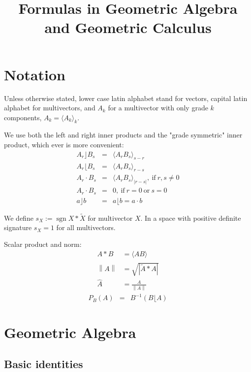 \documentclass[a4paper,12pt]{article}
\title{Formulas in Geometric Algebra and Geometric Calculus}
\author{}
\newcommand{\grade}[2]{\ensuremath{\langle#2\rangle_{#1}}}
\newcommand{\reverse}[1]{\tilde{#1}} %
\newcommand{\linner}{\ensuremath{\rfloor}}
\newcommand{\rinner}{\ensuremath{\lfloor}}
\providecommand{\abs}[1]{\lvert#1\rvert}
\providecommand{\norm}[1]{\left\lVert#1\right\rVert}
\providecommand{\normed}[1]{\hat{#1}}
\DeclareMathOperator{\sign}{sgn}
\providecommand{\signX}[1]{\ensuremath{s_{#1}}}
\begin{document}
\maketitle

\section{Notation}

Unless otherwise stated, lower case latin alphabet stand for vectors, capital latin alphabet for multivectors, and $A_k$ for a multivector with only grade $k$ components, $A_k = \grade{k}{A_k}$.

We use both the left and right inner products and the "grade symmetric" inner product, which ever is more convenient:
\begin{eqnarray}
A_r \linner B_s &=& \grade{s-r}{A_r B_s}\\
A_r \rinner B_s &=& \grade{r-s}{A_r B_s}\\
A_r \cdot B_s &=& \grade{\abs{r-s}}{A_r B_s},\ \textrm{if}\ r, s \neq 0\\
A_r \cdot B_s &=& 0,\ \textrm{if}\ r = 0\ \textrm{or}\ s = 0\\
a \linner b &=& a \rinner b = a \cdot b
\end{eqnarray}

We define $\signX{X} := \sign{X * \reverse{X}}$ for multivector $X$.
In a space with positive definite signature $\signX{X} = 1$ for all multivectors.

Scalar product and norm:
\begin{align}
 A * B &= \grade{}{AB}\\
 \norm{A} &= \sqrt{|\reverse{A} * A|}\\
 \normed{A} &= \frac{A}{\norm{A}}
\end{align}
\begin{eqnarray}
 P_B(A) &=& B^{-1}(B \rinner A)
\end{eqnarray}

\section{Geometric Algebra}

\subsection{Basic identities}
\end{document}
